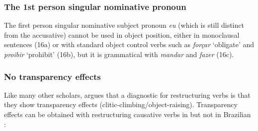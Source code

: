 \documentclass[output=paper]{langsci/langscibook}
\begin{document}
\subsubsection{The 1st person singular nominative pronoun}%

The first person singular nominative subject pronoun \textit{eu} (which is still distinct from the accusative) cannot be used in object position, either in monoclausal sentences (16a) or with standard object control verbs such as \textit{forçar} ‘obligate’ and \textit{proibir} ‘prohibit’ (16b), but it is grammatical with \textit{mandar} and \textit{fazer} (16c). 

\ea%
    \label{ex:moreno:16}
    \z
\z

\subsubsection{No transparency effects}%

Like many other scholars, \citet{Cinque2004} argues that a diagnostic for restructuring verbs is that they show transparency effects (clitic-climbing\slash object-raising). Transparency effects can be obtained with restructuring causative verbs in  but not in Brazilian :

\ea%
    \label{ex:moreno:17}
    \z
\z
\end{document}
